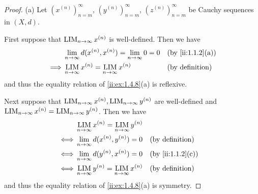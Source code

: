 \begin{proof}{(a)}
  Let \((x^{(n)})_{n = m}^\infty\), \((y^{(n)})_{n = m}^\infty\), \((z^{(n)})_{n = m}^\infty\) be Cauchy sequences in \((X, d)\).

  First suppose that \(\operatorname*{LIM}_{n \to \infty} x^{(n)}\) is well-defined.
  Then we have
  \begin{align*}
             & \lim_{n \to \infty} d(x^{(n)}, x^{(n)}) = \lim_{n \to \infty} 0 = 0 &  & \by{ii:1.1.2}[a]       \\
    \implies & \LIM_{n \to \infty} x^{(n)} = \LIM_{n \to \infty} x^{(n)}           &  & \text{(by definition)}
  \end{align*}
  and thus the equality relation of \cref{ii:ex:1.4.8}(a) is reflexive.

  Next suppose that \(\operatorname*{LIM}_{n \to \infty} x^{(n)}, \operatorname*{LIM}_{n \to \infty} y^{(n)}\) are well-defined and \(\operatorname*{LIM}_{n \to \infty} x^{(n)} = \operatorname*{LIM}_{n \to \infty} y^{(n)}\).
  Then we have
  \begin{align*}
         & \LIM_{n \to \infty} x^{(n)} = \LIM_{n \to \infty} y^{(n)}                             \\
    \iff & \lim_{n \to \infty} d(x^{(n)}, y^{(n)}) = 0               &  & \text{(by definition)} \\
    \iff & \lim_{n \to \infty} d(y^{(n)}, x^{(n)}) = 0               &  & \by{ii:1.1.2}[c]       \\
    \iff & \LIM_{n \to \infty} y^{(n)} = \LIM_{n \to \infty} x^{(n)} &  & \text{(by definition)}
  \end{align*}
  and thus the equality relation of \cref{ii:ex:1.4.8}(a) is symmetry.


\end{proof}
